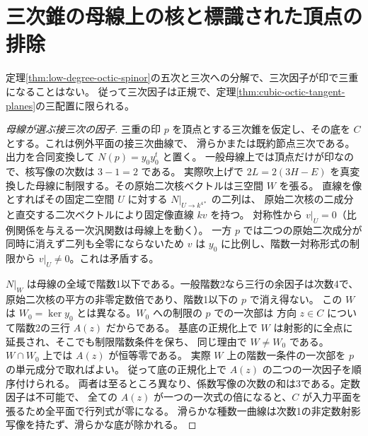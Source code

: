 \section{三次錐の母線上の核と標識された頂点の排除}
\label{sec:marked-cubic-cone-exclusion}
\begin{theorem}\label{thm:marked-cubic-cone-exclusion}
定理\ref{thm:low-degree-octic-spinor}の五次と三次への分解で、三次因子が印で三重になることはない。
従って三次因子は正規で、定理\ref{thm:cubic-octic-tangent-planes}の三配置に限られる。
\end{theorem}
\begin{proof}[母線が選ぶ接三次の因子]
三重の印 $p$ を頂点とする三次錐を仮定し、その底を $C$ とする。これは例外平面の接三次曲線で、
滑らかまたは既約節点三次である。出力を合同変換して $N(p)=y_0y_0^t$ と置く。
一般母線上では頂点だけが印なので、核写像の次数は $3-1=2$ である。
実際吹上げで $2L=2(3H-E)$ を真変換した母線に制限する。その原始二次核ベクトルは三空間 $W$ を張る。
直線を像とすればその固定二空間 $U$ に対する $N|_{U\to k^{4*}}$ の二列は、
原始二次核の二成分と直交する二次ベクトルにより固定像直線 $kv$ を持つ。
対称性から $v|_U=0$（比例関係を与える一次汎関数は母線上を動く）。
一方 $p$ では二つの原始二次成分が同時に消えず二列も全零にならないため
$v$ は $y_0$ に比例し、階数一対称形式の制限から $v|_U\ne0$。これは矛盾する。

$N|_W$ は母線の全域で階数1以下である。一般階数2なら三行の余因子は次数4で、
原始二次核の平方の非零定数倍であり、階数1以下の $p$ で消え得ない。
この $W$ は $W_0=\ker y_0$ とは異なる。$W_0$ への制限の $p$ での一次部は
方向 $z\in C$ について階数2の三行 $A(z)$ だからである。
基底の正規化上で $W$ は射影的に全点に延長され、そこでも制限階数条件を保ち、
同じ理由で $W\ne W_0$ である。$W\cap W_0$ 上では $A(z)$ が恒等零である。
実際 $W$ 上の階数一条件の一次部を $p$ の単元成分で取ればよい。
従って底の正規化上で $A(z)$ の二つの一次因子を順序付けられる。
両者は至るところ異なり、係数写像の次数の和は3である。定数因子は不可能で、
全ての $A(z)$ が一つの一次式の倍になると、$C$ が入力平面を張るため全平面で行列式が零になる。
滑らかな種数一曲線は次数1の非定数射影写像を持たず、滑らかな底が除かれる。


\end{proof}
